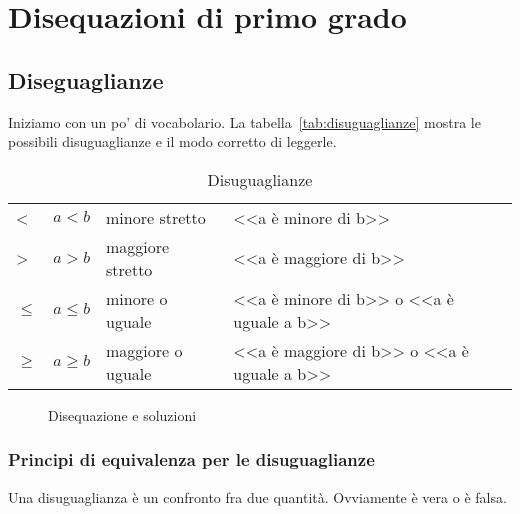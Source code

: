 \chapter{Disequazioni di primo grado}
\label{cha:DisequazioniDiPrimogrado}
 \section{Diseguaglianze}
\label{sec:Disequg}Iniziamo con un po' di vocabolario. La tabella~\vref{tab:disuguaglianze} mostra le possibili disuguaglianze e il modo corretto di  leggerle.
\begin{table}
\centering
\begin{tabular}{lcll}
	\toprule
<&$a<b$&minore stretto&<<a è minore di b>>\\
>&$a>b$&maggiore stretto& <<a è maggiore di b>>\\
$\leq$&$a\leq b$&minore o uguale& <<a è minore di b>> o <<a è uguale a b>> \\
$\geq$&$a\geq b$&maggiore o uguale&<<a è maggiore di b>> o <<a è uguale a b>>\\
\bottomrule
\end{tabular}
\caption{Disuguaglianze}
\label{tab:disuguaglianze}
\end{table}
\begin{figure}
	\centering
{}
	\caption{Disequazione e soluzioni}
	\label{fig:DidequazioniEsoluzioni}
\end{figure}
\subsection{Principi di equivalenza per le disuguaglianze}
\label{sec:PrincipiDiEquvalenzaPerLeDisuguaglianze}
Una disuguaglianza è un confronto fra due quantità. Ovviamente è vera o è falsa.


